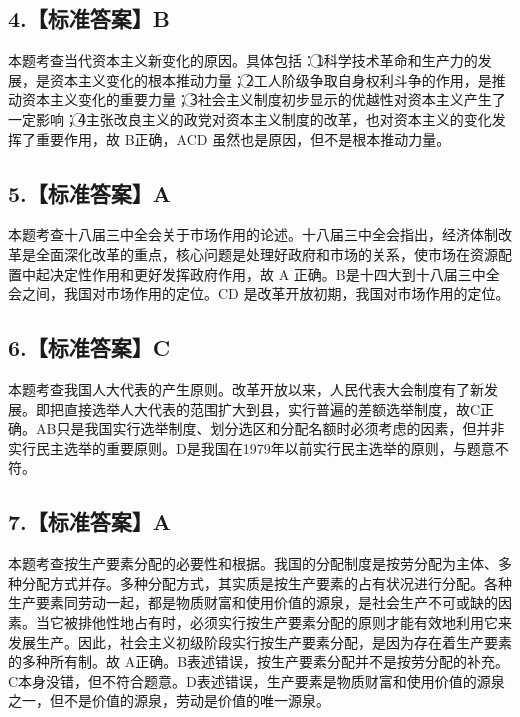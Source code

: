 \documentclass[UTF8,11pt]{ctexart}
\begin{document}
\subsection*{4.【标准答案】B}

本题考查当代资本主义新变化的原因。具体包括：\textcircled{1}科学技术革命和生产力的发展，是资本主义变化的根本推动力量；\textcircled{2}工人阶级争取自身权利斗争的作用，是推动资本主义变化的重要力量；\textcircled{3}社会主义制度初步显示的优越性对资本主义产生了一定影响；\textcircled{4}主张改良主义的政党对资本主义制度的改革，也对资本主义的变化发挥了重要作用，故 B正确，ACD 虽然也是原因，但不是根本推动力量。


\subsection*{5.【标准答案】A}

本题考查十八届三中全会关于市场作用的论述。十八届三中全会指出，经济体制改革是全面深化改革的重点，核心问题是处理好政府和市场的关系，使市场在资源配置中起决定性作用和更好发挥政府作用，故 A 正确。B是十四大到十八届三中全会之间，我国对市场作用的定位。CD 是改革开放初期，我国对市场作用的定位。


\subsection*{6.【标准答案】C}

本题考查我国人大代表的产生原则。改革开放以来，人民代表大会制度有了新发展。即把直接选举人大代表的范围扩大到县，实行普遍的差额选举制度，故C正确。AB只是我国实行选举制度、划分选区和分配名额时必须考虑的因素，但并非实行民主选举的重要原则。D是我国在1979年以前实行民主选举的原则，与题意不符。


\subsection*{7.【标准答案】A}

本题考查按生产要素分配的必要性和根据。我国的分配制度是按劳分配为主体、多种分配方式并存。多种分配方式，其实质是按生产要素的占有状况进行分配。各种生产要素同劳动一起，都是物质财富和使用价值的源泉，是社会生产不可或缺的因素。当它被排他性地占有时，必须实行按生产要素分配的原则才能有效地利用它来发展生产。因此，社会主义初级阶段实行按生产要素分配，是因为存在着生产要素的多种所有制。故 A正确。B表述错误，按生产要素分配并不是按劳分配的补充。C本身没错，但不符合题意。D表述错误，生产要素是物质财富和使用价值的源泉之一，但不是价值的源泉，劳动是价值的唯一源泉。
\end{document}
